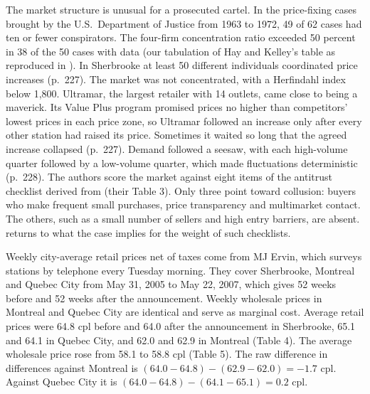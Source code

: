 The market structure is unusual for a prosecuted cartel. In the price-fixing cases brought by the U.S.\ Department of Justice from
1963 to 1972, 49 of 62 cases had ten or fewer conspirators. The four-firm concentration ratio exceeded 50 percent in 38 of the 50 cases
with data (our tabulation of Hay and Kelley's table as reproduced in \citealp[Table~2]{ErutkuHildebrand2010}). In Sherbrooke at least
50 different individuals coordinated price increases (p.~227). The market was not concentrated, with a Herfindahl index below 1,800.
Ultramar, the largest retailer with 14 outlets, came close to being a maverick. Its Value Plus program promised prices no higher than
competitors' lowest prices in each price zone, so Ultramar followed an increase only after every other station had raised its price.
Sometimes it waited so long that the agreed increase collapsed (p.~227). Demand followed a seesaw, with each high-volume quarter
followed by a low-volume quarter, which made fluctuations deterministic (p.~228). The authors score the market against eight items of
the antitrust checklist derived from \citet{Stigler1964} (their Table 3). Only three point toward collusion: buyers who make frequent
small purchases, price transparency and multimarket contact. The others, such as a small number of sellers and high entry barriers,
are absent.  returns to what the case implies for the weight of such checklists.

Weekly city-average retail prices net of taxes come from MJ Ervin, which surveys stations by telephone every Tuesday morning. They
cover Sherbrooke, Montreal and Quebec City from May 31, 2005 to May 22, 2007, which gives 52 weeks before and 52 weeks after the
announcement. Weekly wholesale prices in Montreal and Quebec City are identical and serve as marginal cost. Average retail prices were
64.8 cpl before and 64.0 after the announcement in Sherbrooke, 65.1 and 64.1 in Quebec City, and 62.0 and 62.9 in Montreal (Table 4).
The average wholesale price rose from 58.1 to 58.8 cpl (Table 5). The raw difference in differences against Montreal is
$(64.0-64.8)-(62.9-62.0)=-1.7$ cpl. Against Quebec City it is $(64.0-64.8)-(64.1-65.1)=0.2$ cpl.

